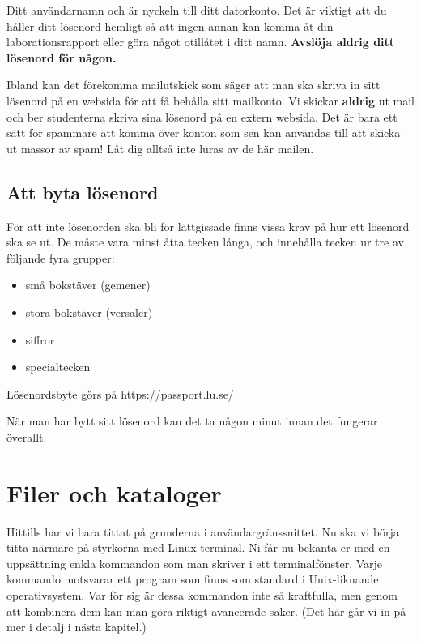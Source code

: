\documentclass[a4paper,twocolumn]{book}
\begin{document}
Ditt användarnamn och  är nyckeln till ditt
datorkonto. Det är viktigt att du håller ditt lösenord hemligt så att
ingen annan kan komma åt din laborationsrapport eller göra något
otillåtet i ditt namn. \textbf{Avslöja aldrig ditt lösenord för någon.}

Ibland kan det förekomma mailutskick som säger att man ska skriva in sitt
lösenord på en websida för att få behålla sitt mailkonto.  Vi skickar
\textbf{aldrig} ut mail och ber studenterna skriva sina lösenord på en extern
websida. Det är bara ett sätt för spammare att komma över konton som sen
kan användas till att skicka ut massor av spam! Låt dig alltså inte luras av de
här mailen.

\subsection{Att byta lösenord}

För att inte lösenorden ska bli för lättgissade finns vissa
krav på hur ett lösenord ska se ut. De måste vara minst åtta tecken
långa, och innehålla tecken ur tre av följande fyra grupper:
\begin{itemize}
  \item små bokstäver (gemener)
  \item stora bokstäver (versaler)
  \item siffror
  \item specialtecken
\end{itemize}

Lösenordsbyte görs på
\url{https://passport.lu.se/}

När man har bytt sitt lösenord kan det ta någon minut innan det fungerar
överallt.

\section{Filer och kataloger}

Hittills har vi bara tittat på grunderna i användargränssnittet. Nu ska vi börja
titta närmare på styrkorna med Linux terminal. Ni får nu bekanta er med en uppsättning
enkla kommandon som man skriver i ett terminalfönster. Varje kommando motsvarar ett program som finns som standard i Unix-liknande operativsystem.
Var för sig är dessa kommandon inte så kraftfulla, men genom att kombinera dem kan man göra
riktigt avancerade saker. (Det här går vi in på mer i detalj i nästa kapitel.)
\end{document}
